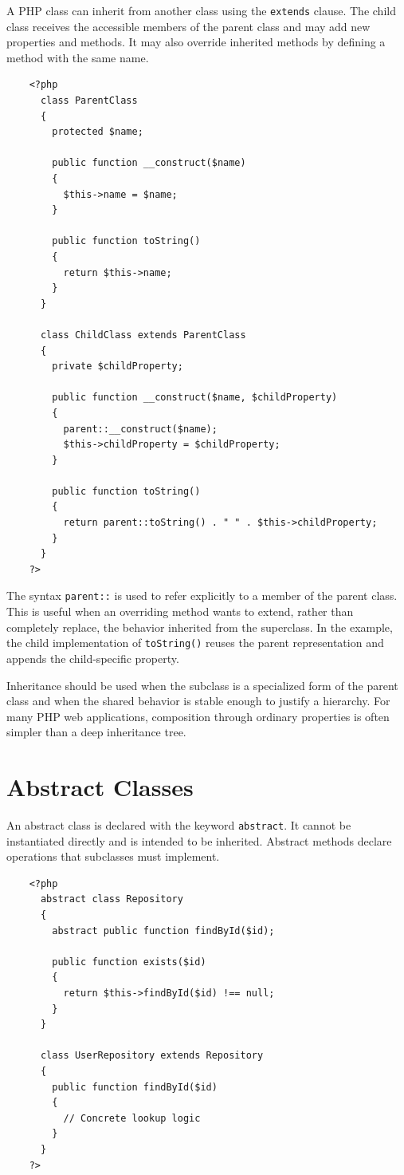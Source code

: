 \documentclass{scrbook}
\begin{document}
	A PHP class can inherit from another class using the \texttt{extends} clause. The child class receives the accessible members of the parent class and may add new properties and methods. It may also override inherited methods by defining a method with the same name.
	
	\begin{lstlisting}
	<?php
	  class ParentClass
	  {
		protected $name;
	
		public function __construct($name)
		{
		  $this->name = $name;
		}
			
		public function toString()
		{
		  return $this->name;
		}
	  }
		
	  class ChildClass extends ParentClass
	  {
		private $childProperty;
	
		public function __construct($name, $childProperty)
		{
		  parent::__construct($name);
		  $this->childProperty = $childProperty;
		}
	
		public function toString()
		{
		  return parent::toString() . " " . $this->childProperty;
		}
	  }
	?>
	\end{lstlisting}
	
	The syntax \texttt{parent::} is used to refer explicitly to a member of the parent class. This is useful when an overriding method wants to extend, rather than completely replace, the behavior inherited from the superclass. In the example, the child implementation of \texttt{toString()} reuses the parent representation and appends the child-specific property.
	
	Inheritance should be used when the subclass is a specialized form of the parent class and when the shared behavior is stable enough to justify a hierarchy. For many PHP web applications, composition through ordinary properties is often simpler than a deep inheritance tree.
	
	\section{Abstract Classes}
	
	An abstract class is declared with the keyword \texttt{abstract}. It cannot be instantiated directly and is intended to be inherited. Abstract methods declare operations that subclasses must implement.
	
	\begin{lstlisting}
	<?php
	  abstract class Repository
	  {
		abstract public function findById($id);
	
		public function exists($id)
		{
		  return $this->findById($id) !== null;
		}
	  }
	
	  class UserRepository extends Repository
	  {
		public function findById($id)
		{
		  // Concrete lookup logic
		}
	  }
	?>
	\end{lstlisting}
	
\end{document}

